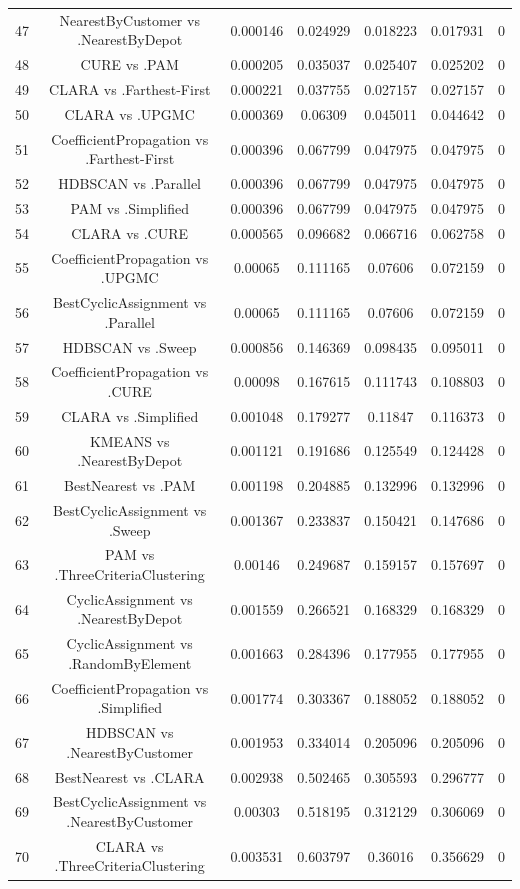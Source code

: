 \documentclass[a4paper,10pt]{article}
\begin{document}
\begin{landscape}
\begin{table}[!htp]
\begin{tabular}{ccccccc}
47&NearestByCustomer vs .NearestByDepot&0.000146&0.024929&0.018223&0.017931&0\\
48&CURE vs .PAM&0.000205&0.035037&0.025407&0.025202&0\\
49&CLARA vs .Farthest-First&0.000221&0.037755&0.027157&0.027157&0\\
50&CLARA vs .UPGMC&0.000369&0.06309&0.045011&0.044642&0\\
51&CoefficientPropagation vs .Farthest-First&0.000396&0.067799&0.047975&0.047975&0\\
52&HDBSCAN vs .Parallel&0.000396&0.067799&0.047975&0.047975&0\\
53&PAM vs .Simplified&0.000396&0.067799&0.047975&0.047975&0\\
54&CLARA vs .CURE&0.000565&0.096682&0.066716&0.062758&0\\
55&CoefficientPropagation vs .UPGMC&0.00065&0.111165&0.07606&0.072159&0\\
56&BestCyclicAssignment vs .Parallel&0.00065&0.111165&0.07606&0.072159&0\\
57&HDBSCAN vs .Sweep&0.000856&0.146369&0.098435&0.095011&0\\
58&CoefficientPropagation vs .CURE&0.00098&0.167615&0.111743&0.108803&0\\
59&CLARA vs .Simplified&0.001048&0.179277&0.11847&0.116373&0\\
60&KMEANS vs .NearestByDepot&0.001121&0.191686&0.125549&0.124428&0\\
61&BestNearest vs .PAM&0.001198&0.204885&0.132996&0.132996&0\\
62&BestCyclicAssignment vs .Sweep&0.001367&0.233837&0.150421&0.147686&0\\
63&PAM vs .ThreeCriteriaClustering&0.00146&0.249687&0.159157&0.157697&0\\
64&CyclicAssignment vs .NearestByDepot&0.001559&0.266521&0.168329&0.168329&0\\
65&CyclicAssignment vs .RandomByElement&0.001663&0.284396&0.177955&0.177955&0\\
66&CoefficientPropagation vs .Simplified&0.001774&0.303367&0.188052&0.188052&0\\
67&HDBSCAN vs .NearestByCustomer&0.001953&0.334014&0.205096&0.205096&0\\
68&BestNearest vs .CLARA&0.002938&0.502465&0.305593&0.296777&0\\
69&BestCyclicAssignment vs .NearestByCustomer&0.00303&0.518195&0.312129&0.306069&0\\
70&CLARA vs .ThreeCriteriaClustering&0.003531&0.603797&0.36016&0.356629&0\\

\end{tabular}
\end{table}
\end{landscape}
\end{document}
